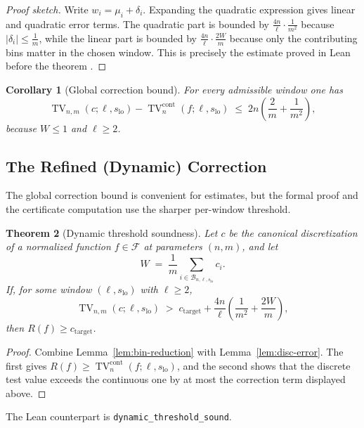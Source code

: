 \documentclass[11pt, letterpaper]{article}
\theoremstyle{paperplain}
\newtheorem{theorem}{Theorem}[section]
\newtheorem{corollary}[theorem]{Corollary}
\theoremstyle{paperdef}
\begin{document}
\begin{proof}[Proof sketch]
Write $w_i=\mu_i+\delta_i$.  Expanding the quadratic expression gives
linear and quadratic error terms.  The quadratic part is bounded by
$\tfrac{4n}{\ell}\cdot\tfrac{1}{m^2}$ because
$|\delta_i|\le \tfrac{1}{m}$, while the linear part is bounded by
$\tfrac{4n}{\ell}\cdot \tfrac{2W}{m}$ because only the contributing
bins matter in the chosen window.  This is precisely the estimate
proved in Lean before the theorem
.
\end{proof}

\begin{corollary}[Global correction bound]
For every admissible window one has
\[
  \operatorname{TV}_{n,m}(c;\ell,s_{\mathrm{lo}})
  -
  \operatorname{TV}^{\mathrm{cont}}_n(f;\ell,s_{\mathrm{lo}})
  \;\le\;
  2n\left(\frac{2}{m}+\frac{1}{m^2}\right),
\]
because $W\le 1$ and $\ell\ge 2$.
\end{corollary}

\subsection{The Refined (Dynamic) Correction}

The global correction bound is convenient for estimates, but the formal
proof and the certificate computation use the sharper per-window
threshold.

\begin{theorem}[Dynamic threshold soundness]
\label{thm:dynamic-threshold}
Let $c$ be the canonical discretization of a normalized function
$f\in\mathcal{F}$ at parameters $(n,m)$, and let
\[
  W
  \;=\;
  \frac{1}{m}
  \sum_{i\in \mathcal{B}_{n,\ell,s_{\mathrm{lo}}}} c_i.
\]
If, for some window $(\ell,s_{\mathrm{lo}})$ with $\ell\ge 2$,
\[
  \operatorname{TV}_{n,m}(c;\ell,s_{\mathrm{lo}})
  \;>\;
  c_{\mathrm{target}}
  +
  \frac{4n}{\ell}
  \left(
    \frac{1}{m^2} + \frac{2W}{m}
  \right),
\]
then $R(f)\ge c_{\mathrm{target}}$.
\end{theorem}

\begin{proof}
Combine Lemma~\ref{lem:bin-reduction} with
Lemma~\ref{lem:disc-error}.  The first gives
$R(f)\ge \operatorname{TV}^{\mathrm{cont}}_n(f;\ell,s_{\mathrm{lo}})$,
and the second shows that the discrete test value exceeds the
continuous one by at most the correction term displayed above.
\end{proof}

The Lean counterpart is \texttt{dynamic\_threshold\_sound}.
\end{document}
